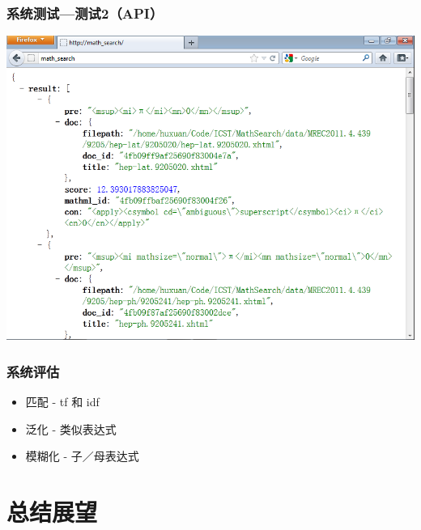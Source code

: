     \begin{frame}
        \frametitle{系统测试---测试2（API）}
        \begin{center}
            \includegraphics[width=.7\paperwidth]{pic/test2_api.png}
        \end{center}
    \end{frame}

    \begin{frame}
        \frametitle{系统评估}
        \begin{itemize}
            \item 匹配 - tf 和 idf
            \item 泛化 - 类似表达式
            \item 模糊化 - 子／母表达式
        \end{itemize}
    \end{frame}
    
    \section{总结展望}
    

